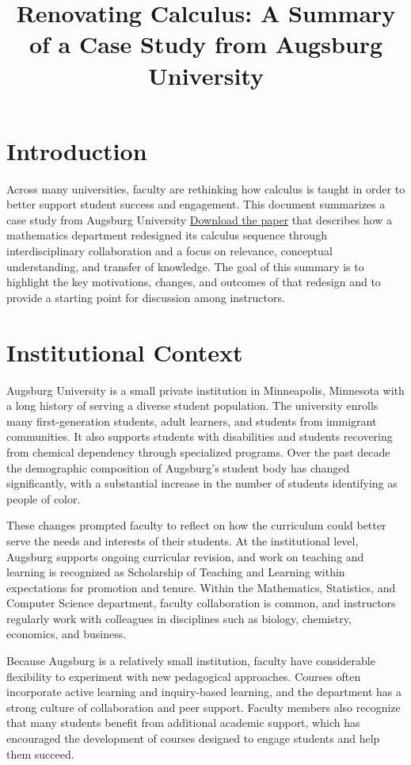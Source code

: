 \documentclass[11pt]{article}
\title{Renovating Calculus: A Summary of a Case Study from Augsburg University}
\date{}
\begin{document}
\maketitle

\onehalfspacing

\section*{Introduction}

Across many universities, faculty are rethinking how calculus is taught in order to better support student success and engagement. This document summarizes a case study from Augsburg University \href{https://arxiv.org/pdf/2406.08508}{Download the paper} that describes how a mathematics department redesigned its calculus sequence through interdisciplinary collaboration and a focus on relevance, conceptual understanding, and transfer of knowledge. The goal of this summary is to highlight the key motivations, changes, and outcomes of that redesign and to provide a starting point for discussion among instructors.

\section*{Institutional Context}

Augsburg University is a small private institution in Minneapolis, Minnesota with a long history of serving a diverse student population. The university enrolls many first-generation students, adult learners, and students from immigrant communities. It also supports students with disabilities and students recovering from chemical dependency through specialized programs. Over the past decade the demographic composition of Augsburg’s student body has changed significantly, with a substantial increase in the number of students identifying as people of color.

These changes prompted faculty to reflect on how the curriculum could better serve the needs and interests of their students. At the institutional level, Augsburg supports ongoing curricular revision, and work on teaching and learning is recognized as Scholarship of Teaching and Learning within expectations for promotion and tenure. Within the Mathematics, Statistics, and Computer Science department, faculty collaboration is common, and instructors regularly work with colleagues in disciplines such as biology, chemistry, economics, and business.

Because Augsburg is a relatively small institution, faculty have considerable flexibility to experiment with new pedagogical approaches. Courses often incorporate active learning and inquiry-based learning, and the department has a strong culture of collaboration and peer support. Faculty members also recognize that many students benefit from additional academic support, which has encouraged the development of courses designed to engage students and help them succeed.
\end{document}
